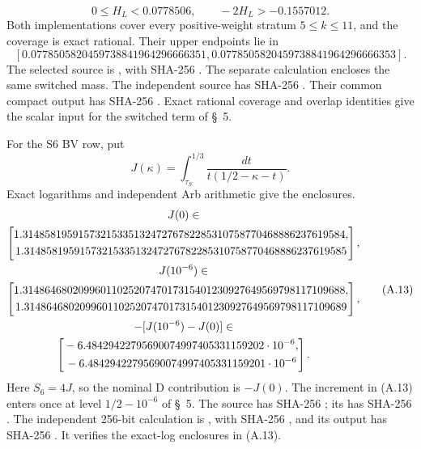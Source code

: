 {\[
 0\le H_L<0.0778506,\qquad -2H_L>-0.1557012.            \tag{A.11}
\]
Both implementations cover every positive-weight stratum $5\le k\le11$,
and the coverage is exact rational.
Their upper endpoints lie in
\[
 [0.0778505820459738841964296666351,
   0.0778505820459738841964296666353].                   \tag{A.12}
\]
The selected source is
, with SHA-256
.
The separate calculation encloses the same switched mass.
The independent source
has SHA-256
.
Their common compact output
has SHA-256
.
Exact rational coverage and overlap identities give the scalar input for
the switched term of \S~5.

For the S6 BV row, put
\[
 J(\kappa)=\int_{\tau_S}^{1/3}\frac{dt}{t(1/2-\kappa-t)}.
\]
Exact logarithms and independent Arb arithmetic give the enclosures.
{\normalsize
\[
\begin{gathered}
 J(0)\in\\\left[\begin{gathered}{}1.3148581959157321533513247276782285310758770468886237619584,\\{}1.3148581959157321533513247276782285310758770468886237619585\end{gathered}\right],\\
 J(10^{-6})\in\\\left[\begin{gathered}{}1.3148646802099601102520747017315401230927649569798117109688,\\{}1.3148646802099601102520747017315401230927649569798117109689\end{gathered}\right],\\
 -[J(10^{-6})-J(0)]\in\\
 \left[\begin{gathered}{}-6.48429422795690074997405331159202\cdot10^{-6},\\{}
 -6.48429422795690074997405331159201\cdot10^{-6}\end{gathered}\right].
 \end{gathered}\tag{A.13}
\]
}
Here $S_6=4J$, so the nominal D contribution is $-J(0)$.
The increment in (A.13) enters once at level $1/2-10^{-6}$ of
\S~5. The source
has SHA-256
;
its  has SHA-256
.
The independent 256-bit calculation is
,
with SHA-256
,
and its output 
has SHA-256
.
It verifies the exact-log enclosures in (A.13).

}
